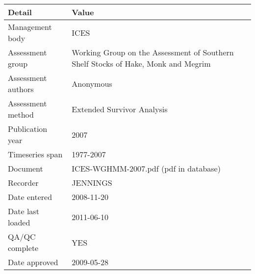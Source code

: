 \begin{table}[htb]
\centering
\begin{tabular}{lp{7cm}}
\toprule
Detail & Value \\
\midrule
Management body    & ICES                                                                              \\
Assessment group   & Working Group on the Assessment of Southern Shelf Stocks of Hake, Monk and Megrim \\
Assessment authors & Anonymous                                                                         \\
Assessment method  & Extended Survivor Analysis                                                        \\
Publication year   & 2007                                                                              \\
Timeseries span    & 1977-2007                                                                         \\
Document           & ICES-WGHMM-2007.pdf (pdf in database)                                             \\
Recorder           & JENNINGS                                                                          \\
Date entered       & 2008-11-20                                                                        \\
Date last loaded   & 2011-06-10                                                                        \\
QA/QC complete     & YES                                                                               \\
Date approved      & 2009-05-28                                                                        \\
\bottomrule
\end{tabular}
\label{tab:assessdet}
\end{table}
